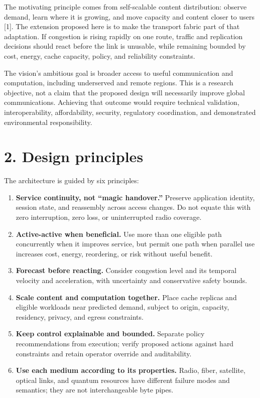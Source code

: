 \documentclass[
  american,
  11pt,
]{article}
\providecommand{\tightlist}{%
  \setlength{\itemsep}{0pt}\setlength{\parskip}{0pt}}
\begin{document}
The motivating principle comes from self-scalable content distribution:
observe demand, learn where it is growing, and move capacity and content
closer to users {[}1{]}. The extension proposed here is to make the
transport fabric part of that adaptation. If congestion is rising
rapidly on one route, traffic and replication decisions should react
before the link is unusable, while remaining bounded by cost, energy,
cache capacity, policy, and reliability constraints.

The vision's ambitious goal is broader access to useful communication
and computation, including underserved and remote regions. This is a
research objective, not a claim that the proposed design will
necessarily improve global communications. Achieving that outcome would
require technical validation, interoperability, affordability, security,
regulatory coordination, and demonstrated environmental responsibility.

\section{2. Design principles}\label{design-principles}

The architecture is guided by six principles:

\begin{enumerate}
\def\labelenumi{\arabic{enumi}.}
\tightlist
\item
  \textbf{Service continuity, not ``magic handover.''} Preserve
  application identity, session state, and reassembly across access
  changes. Do not equate this with zero interruption, zero loss, or
  uninterrupted radio coverage.
\item
  \textbf{Active-active when beneficial.} Use more than one eligible
  path concurrently when it improves service, but permit one path when
  parallel use increases cost, energy, reordering, or risk without
  useful benefit.
\item
  \textbf{Forecast before reacting.} Consider congestion level and its
  temporal velocity and acceleration, with uncertainty and conservative
  safety bounds.
\item
  \textbf{Scale content and computation together.} Place cache replicas
  and eligible workloads near predicted demand, subject to origin,
  capacity, residency, privacy, and egress constraints.
\item
  \textbf{Keep control explainable and bounded.} Separate policy
  recommendations from execution; verify proposed actions against hard
  constraints and retain operator override and auditability.
\item
  \textbf{Use each medium according to its properties.} Radio, fiber,
  satellite, optical links, and quantum resources have different failure
  modes and semantics; they are not interchangeable byte pipes.
\end{enumerate}
\end{document}
